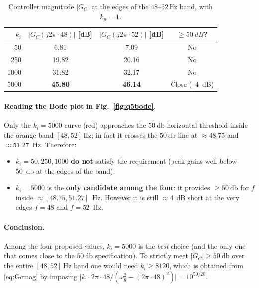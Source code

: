\documentclass[11pt,a4paper]{article}
\begin{document}
\begin{table}[H]
\centering
\caption{Controller magnitude $|G_C|$ at the edges of the
$48\text{--}52\,$Hz band, with $k_p=1$.}
\begin{tabular}{r c c c}
\toprule
$k_i$ & $|G_C(j2\pi\!\cdot\!48)|$ [dB] & $|G_C(j2\pi\!\cdot\!52)|$ [dB] &
$\ge \SI{50}{dB}$? \\
\midrule
   50 &   6.81 &   7.09 & No \\
  250 &  19.82 &  20.16 & No \\
 1000 &  31.82 &  32.17 & No \\
 5000 & \textbf{45.80} & \textbf{46.14} & Close (--$4$~dB) \\
\bottomrule
\end{tabular}
\label{tab:q5gains}
\end{table}

\paragraph{Reading the Bode plot in Fig.~\ref{fig:q5bode}.}
Only the $k_i=\num{5000}$ curve (red) approaches the
$\SI{50}{\decibel}$ horizontal threshold inside the orange band
$[48,52]\,$Hz; in fact it crosses the $\SI{50}{\decibel}$ line at
$\approx 48.75$ and $\approx 51.27$~Hz. Therefore:

\begin{itemize}[itemsep=2pt, topsep=2pt]
  \item $k_i = 50, 250, 1000$ \textbf{do not} satisfy the
        requirement (peak gains well below \SI{50}{\decibel} at the
        edges of the band).
  \item $k_i = \num{5000}$ is the \textbf{only candidate among the
        four}: it provides $\ge \SI{50}{\decibel}$ for $f$ inside
        $\approx[48.75, 51.27]$~Hz. However it is still
        $\approx 4$~dB short at the very edges $f=48$ and $f=52$~Hz.
\end{itemize}

\paragraph{Conclusion.}
Among the four proposed values, $\boxed{k_i = \num{5000}}$ is the
\emph{best} choice (and the only one that comes close to the
$\SI{50}{\decibel}$ specification). To strictly meet
$|G_C| \ge \SI{50}{\decibel}$ over the entire $[48,52]\,$Hz band one
would need $k_i \ge \num{8120}$, which is obtained from
\eqref{eq:Gcmag} by imposing
$\bigl|k_i\!\cdot\!2\pi\!\cdot\!48 \big/ (\omega_g^2 - (2\pi\!\cdot\!48)^2)\bigr|
= 10^{50/20}$.
\end{document}
